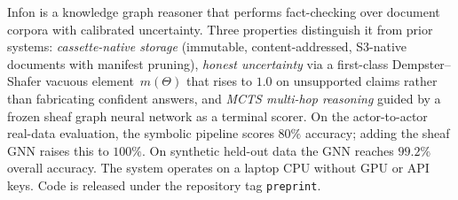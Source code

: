 Infon is a knowledge graph reasoner that performs fact-checking over
document corpora with calibrated uncertainty. Three properties distinguish it
from prior systems: \emph{cassette-native storage} (immutable,
content-addressed, S3-native documents with manifest pruning), \emph{honest
uncertainty} via a first-class Dempster--Shafer vacuous element~$m(\Theta)$
that rises to $1.0$ on unsupported claims rather than fabricating confident
answers, and \emph{MCTS multi-hop reasoning} guided by a frozen sheaf graph
neural network as a terminal scorer. On the actor-to-actor real-data
evaluation, the symbolic pipeline scores $80\%$ accuracy; adding the sheaf
GNN raises this to $100\%$. On synthetic held-out data the GNN reaches
$99.2\%$ overall accuracy. The system operates on a laptop CPU without GPU or
API keys. Code is released under the repository tag \texttt{preprint}.
